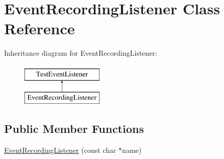 \hypertarget{classtesting_1_1internal_1_1EventRecordingListener}{\section{\-Event\-Recording\-Listener \-Class \-Reference}
\label{d1/dde/classtesting_1_1internal_1_1EventRecordingListener}
}
\-Inheritance diagram for \-Event\-Recording\-Listener\-:\begin{figure}[H]
\begin{center}
\leavevmode
\includegraphics[height=2.000000cm]{d1/dde/classtesting_1_1internal_1_1EventRecordingListener}
\end{center}
\end{figure}
\subsection*{\-Public \-Member \-Functions}
\begin{DoxyCompactItemize}
\item 
\hyperlink{classtesting_1_1internal_1_1EventRecordingListener_a307561be1e16bb9f5d011ff9ad580197}{\-Event\-Recording\-Listener} (const char $\ast$name)
\end{DoxyCompactItemize}
